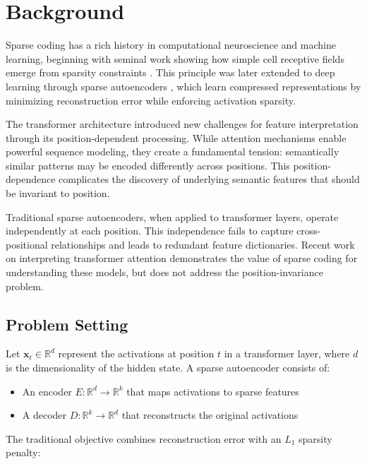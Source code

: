 \documentclass{article} %
\begin{document}
\section{Background}
\label{sec:background}

Sparse coding has a rich history in computational neuroscience and machine learning, beginning with seminal work showing how simple cell receptive fields emerge from sparsity constraints \cite{Olshausen1996EmergenceOS}. This principle was later extended to deep learning through sparse autoencoders \cite{Ranzato2006EfficientLO}, which learn compressed representations by minimizing reconstruction error while enforcing activation sparsity.

The transformer architecture \cite{vaswani2017attention} introduced new challenges for feature interpretation through its position-dependent processing. While attention mechanisms enable powerful sequence modeling, they create a fundamental tension: semantically similar patterns may be encoded differently across positions. This position-dependence complicates the discovery of underlying semantic features that should be invariant to position.

Traditional sparse autoencoders, when applied to transformer layers, operate independently at each position. This independence fails to capture cross-positional relationships and leads to redundant feature dictionaries. Recent work on interpreting transformer attention \cite{Kissane2024InterpretingAL} demonstrates the value of sparse coding for understanding these models, but does not address the position-invariance problem.

\subsection{Problem Setting}
Let $\mathbf{x}_t \in \mathbb{R}^d$ represent the activations at position $t$ in a transformer layer, where $d$ is the dimensionality of the hidden state. A sparse autoencoder consists of:

\begin{itemize}
\item An encoder $E: \mathbb{R}^d \rightarrow \mathbb{R}^k$ that maps activations to sparse features
\item A decoder $D: \mathbb{R}^k \rightarrow \mathbb{R}^d$ that reconstructs the original activations
\end{itemize}

The traditional objective combines reconstruction error with an $L_1$ sparsity penalty:
\end{document}
